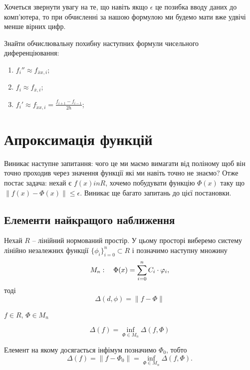 Хочеться звернути увагу на те, що навіть якщо $\epsilon$ це позибка вводу даних до комп'ютера, то при обчисленні за нашою формулою ми будемо мати вже удвічі менше вірних цифр.

\begin{problem}
	Знайти обчислювальну похибну наступних формули чисельного диференціювання:
	\begin{enumerate}
		\item $f_i'' \approx f_{\bar x x, i}$;
		\item $f_i \approx f_{\bar x, i}$;
		\item $f_i' \approx f_{\mathring{x} x, i} = \frac{f_{i + 1} - f_{i - 1}}{2 h}$;
	\end{enumerate}
\end{problem}

\section{Апроксимація функцій}

Виникає наступне запитання: чого це ми маємо вимагати від поліному щоб він точно проходив через значення функції які ми навіть точно не знаємо? Отже постає задача: нехай є $f(x) in R$, хочемо побудувати функцію $\Phi(x)$ таку що $\| f(x) - \Phi(x) \| \le \epsilon$. Виникає ще багато запитань до цієї постановки.

\subsection{Елементи найкращого наближення}

Нехай $R$ -- лінійний нормований простір. У цьому просторі виберемо систему лінійно незалежних функції $\{\phi_i\}_{i=0}^n \subset R$ і позначимо наступну множину
\begin{equation}
	\label{eq:2.1}
	M_n: \quad \Phi(x) = \displaystyle\sum\limits_{i = 0}^n C_i \cdot \varphi_i,
\end{equation}
тоді
\begin{equation}
	\label{eq:2.2}
	\Delta(d, \phi) = \| f - \Phi\|
\end{equation}

$f \in R$, $\Phi \in M_n$

\begin{equation}
	\label{eq:2.3}
	\Delta(f) = \inf_{\Phi \in M_n} \Delta (f, \Phi)
\end{equation}

Елемент на якому досягається інфімум позначимо $\Phi_0$, тобто
\begin{equation}
	\label{eq:2.4}
	\Delta (f) = \| f - \Phi_0 \| = \inf_{\Phi \in M_n} \Delta (f, \Phi).
\end{equation}

